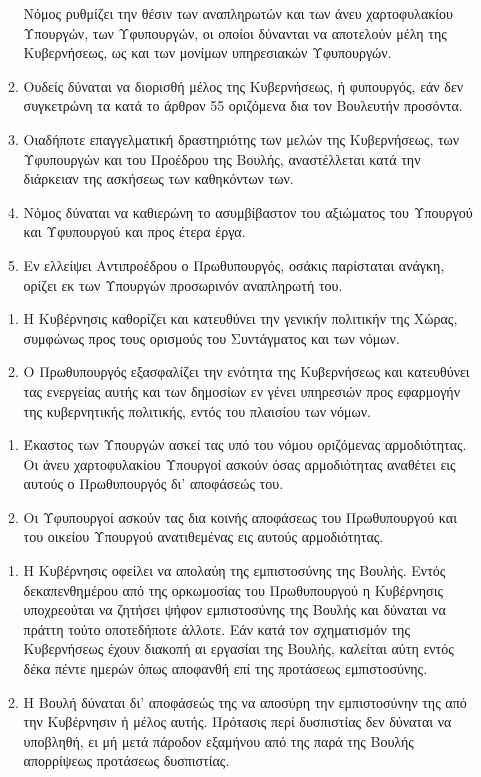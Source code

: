 \documentclass[twoside, a4paper, 10pt]{article}
\begin{document}
\begin{multicols}{2}
\begin{enumerate}
\begin{BigQuote}
\begin{enumerate}
	Νόμος ρυθμίζει την θέσιν των αναπληρωτών και των άνευ χαρτοφυλακίου Υπουργών, των Υφυπουργών, οι οποίοι δύνανται να αποτελούν μέλη της Κυβερνήσεως, ως και των μονίμων υπηρεσιακών Υφυπουργών. 
  \item[2.] Ουδείς δύναται να διορισθή μέλος της Κυβερνήσεως, ή φυπουργός, εάν δεν συγκετρώνη  τα κατά το άρθρον 55 οριζόμενα δια τον Βουλευτήν προσόντα.
  \item[3.] Οιαδήποτε επαγγελματική δραστηριότης των μελών της Κυβερνήσεως, των Υφυπουργών και του Προέδρου της Βουλής, αναστέλλεται κατά την διάρκειαν της ασκήσεως των καθηκόντων των.
  \item[4.] Νόμος δύναται να καθιερώνη το ασυμβίβαστον του αξιώματος του Υπουργού και Υφυπουργού και προς έτερα έργα.
  \item[5.] Εν ελλείψει Αντιπροέδρου ο Πρωθυπουργός, οσάκις παρίσταται ανάγκη, ορίζει εκ των Υπουργών προσωρινόν αναπληρωτή του.
\end{enumerate}

\begin{enumerate}
  \item[1.] Η Κυβέρνησις καθορίζει και κατευθύνει την γενικήν πολιτικήν της Χώρας, συμφώνως προς τους ορισμούς του Συντάγματος και των νόμων.
  \item[2.] Ο Πρωθυπουργός εξασφαλίζει την ενότητα της Κυβερνήσεως και κατευθύνει τας ενεργείας αυτής και των δημοσίων εν γένει υπηρεσιών προς εφαρμογήν της κυβερνητικής πολιτικής, εντός του πλαισίου των νόμων.
\end{enumerate}

\begin{enumerate}
  \item[1.] Έκαστος των Υπουργών ασκεί τας υπό του νόμου οριζόμενας αρμοδιότητας. Οι άνευ χαρτοφυλακίου Υπουργοί ασκούν όσας αρμοδιότητας αναθέτει εις αυτούς ο Πρωθυπουργός δι' αποφάσεώς του.
  \item[2.] Οι Υφυπουργοί ασκούν τας δια κοινής αποφάσεως του Πρωθυπουργού και του οικείου Υπουργού ανατιθεμένας εις αυτούς αρμοδιότητας.
\end{enumerate}

\begin{enumerate}
  \item[1.] Η Κυβέρνησις οφείλει να απολαύη της εμπιστοσύνης της Βουλής. Εντός δεκαπενθημέρου από της ορκωμοσίας του Πρωθυπουργού η Κυβέρνησις υποχρεούται να ζητήσει ψήφον εμπιστοσύνης της Βουλής και δύναται να πράττη τούτο οποτεδήποτε άλλοτε.  Εάν κατά τον σχηματισμόν της Κυβερνήσεως έχουν διακοπή αι εργασίαι της Βουλής, καλείται αύτη εντός δέκα πέντε ημερών όπως αποφανθή επί της προτάσεως εμπιστοσύνης.
  \item[2.] Η Βουλή δύναται δι' αποφάσεώς της να αποσύρη την εμπιστοσύνην της από την Κυβέρνησιν ή μέλος αυτής. Πρότασις περί δυσπιστίας δεν δύναται να υποβληθή, ει μή  μετά πάροδον εξαμήνου από της παρά της Βουλής απορρίψεως προτάσεως δυσπιστίας.


\end{enumerate}
\end{BigQuote}
\end{enumerate}
\end{multicols}
\end{document}

